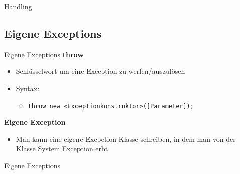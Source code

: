 \begin{frame}{Handling}
		
\end{frame}

\subsection{Eigene Exceptions}
\begin{frame}{Eigene Exceptions}
	\textbf{throw}\\
	\begin{itemize}
		\item Schlüsselwort um eine Exception zu werfen/auszulösen
		\item Syntax:
		\begin{itemize}
			\item \texttt{throw new \alert{<Exceptionkonstruktor>}(\alert{[Parameter]});}
		\end{itemize}
	\end{itemize}
	\textbf{Eigene Exception}\\
	\begin{itemize}
		\item Man kann eine eigene Excpetion-Klasse schreiben, in dem man von der Klasse \alert{System.Exception} erbt
	\end{itemize}
\end{frame}

\begin{frame}{Eigene Exceptions}
	
\end{frame}


